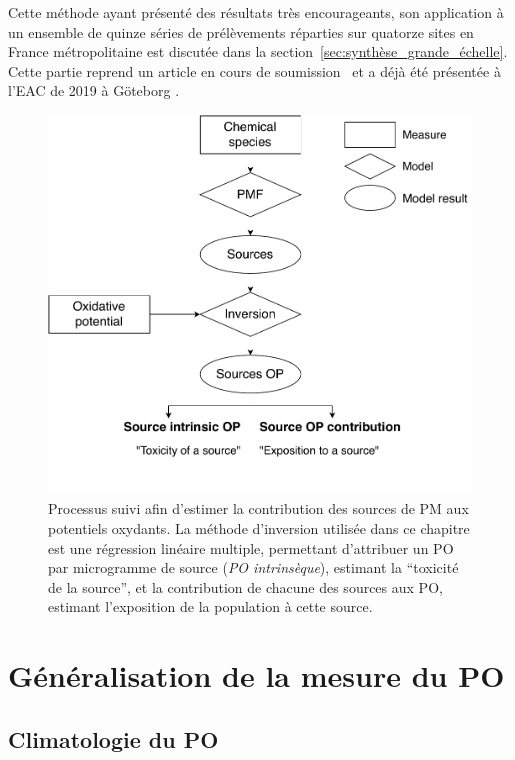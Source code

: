 Cette méthode ayant présenté des résultats très encourageants, son application à un
ensemble de quinze séries de prélèvements réparties sur quatorze sites en France métropolitaine est
discutée dans la section~\ref{sec:synthèse_grande_échelle}.
Cette partie reprend un article en cours de soumission~\autocite{weberSourceinprep.} et a
déjà été présentée à l'EAC de 2019 à Göteborg \autocite{weberSources2019}.

\begin{figure}[ht]
    \centering
    \includegraphics[width=0.8\linewidth]{figures/chapter04/flowchart_inversion.pdf}
    \caption[Processus suivi afin d'estimer la contribution des sources de PM aux
    potentiels oxydants]{Processus suivi afin d'estimer la contribution des sources de PM aux
        potentiels oxydants. La méthode d'inversion utilisée dans ce chapitre est une
        régression linéaire multiple, permettant d'attribuer un PO par microgramme de source
        (\textit{PO intrinsèque}), estimant la ``toxicité de la source'', et la contribution de
    chacune des sources aux PO, estimant l'exposition de la population à cette source.}%
    \label{fig:workflow_inversion}
\end{figure}


\section{Généralisation de la mesure du PO}%
\label{sec:généralisation_de_mesure_du_po}

\subsection{Climatologie du PO}%
\label{sub:climatologie_du_po}

